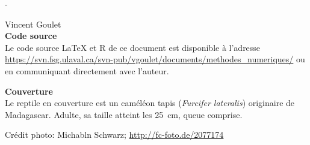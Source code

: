 \begingroup
\calccentering{\unitlength}
\begin{adjustwidth*}{\unitlength}{-\unitlength}
  \setlength{\parindent}{0pt}
  \setlength{\parskip}{\baselineskip}

  {\textcopyright} {\year} Vincent Goulet \\

  

  \textbf{Code source} \\
  Le code source {\LaTeX} et R de ce document est disponible à l'adresse
    \url{https://svn.fsg.ulaval.ca/svn-pub/vgoulet/documents/methodes_numeriques/}
  ou en communiquant directement avec l'auteur.

  \textbf{Couverture} \\
  Le reptile en couverture est un caméléon tapis (\emph{Furcifer
    lateralis}) originaire de Madagascar. Adulte, sa taille atteint
  les 25~cm, queue comprise.

  Crédit photo: Michabln Schwarz; \url{http://fc-foto.de/2077174}
\end{adjustwidth*}
\endgroup

